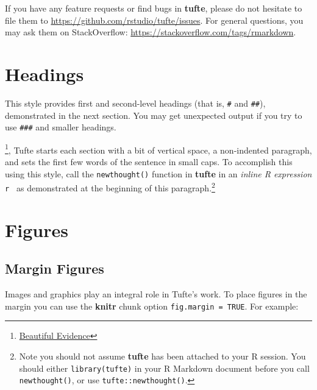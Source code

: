 \documentclass[]{tufte-handout}
\begin{document}
If you have any feature requests or find bugs in \textbf{tufte}, please
do not hesitate to file them to
\url{https://github.com/rstudio/tufte/issues}. For general questions,
you may ask them on StackOverflow:
\url{https://stackoverflow.com/tags/rmarkdown}.

\hypertarget{headings}{%
\section{Headings}\label{headings}}

This style provides first and second-level headings (that is,
\texttt{\#} and \texttt{\#\#}), demonstrated in the next section. You
may get unexpected output if you try to use \texttt{\#\#\#} and smaller
headings.

\footnote{\href{https://www.edwardtufte.com/tufte/books_be}{Beautiful
  Evidence}}, Tufte starts each section with a bit of vertical space, a
non-indented paragraph, and sets the first few words of the sentence in
small caps. To accomplish this using this style, call the
\texttt{newthought()} function in \textbf{tufte} in an \emph{inline R
expression} \texttt{\textasciigrave{}r\ \textasciigrave{}} as
demonstrated at the beginning of this paragraph.\footnote{Note you
  should not assume \textbf{tufte} has been attached to your R session.
  You should either \texttt{library(tufte)} in your R Markdown document
  before you call \texttt{newthought()}, or use
  \texttt{tufte::newthought()}.}

\hypertarget{figures}{%
\section{Figures}\label{figures}}

\hypertarget{margin-figures}{%
\subsection{Margin Figures}\label{margin-figures}}

Images and graphics play an integral role in Tufte's work. To place
figures in the margin you can use the \textbf{knitr} chunk option
\texttt{fig.margin\ =\ TRUE}. For example:
\end{document}
